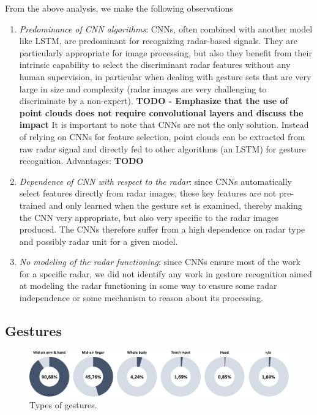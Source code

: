From the above analysis, we make the following observations
\begin{enumerate}
    \item \textit{Predominance of CNN algorithms}: CNNs, often combined with another model like LSTM, are predominant for recognizing radar-based signals. They are particularly appropriate for image processing, but also they benefit from their intrinsic capability to select the discriminant radar features without any human supervision, in particular when dealing with gesture sets that are very large in size and complexity (radar images are very challenging to discriminate by a non-expert).
    \textbf{TODO - Emphasize that the use of point clouds does not require convolutional layers and discuss the impact} 
    It is important to note that CNNs are not the only solution. Instead of relying on CNNs for feature selection, point clouds can be extracted from raw radar signal and directly fed to other algorithms (\eg an LSTM) for gesture recognition\cite{Palipana:2021}. Advantages: \textbf{TODO}
    \item \textit{Dependence of CNN with respect to the radar}: since CNNs automatically select features directly from radar images, these key features are not pre-trained and only learned when the gesture set is examined, thereby making the CNN very appropriate, but also very specific to the radar images produced. The CNNs therefore suffer from a high dependence on radar type and possibly radar unit for a given model. 
    \item \textit{No modeling of the radar functioning}: since CNNs ensure most of the work for a specific radar, we did not identify any work in gesture recognition aimed at modeling the radar functioning in some way to ensure some radar independence or some mechanism to reason about its processing. 
\end{enumerate}



\subsection{Gestures} \label{sec:state_of_the_art:radar:gestures}

\begin{figure}[hbt]
    \centering
    \includegraphics[width=\linewidth]{Figures/StateOfTheArt/Radar/gestures-type.pdf}
    \caption{Types of gestures.}
    \label{fig:state_of_the_art:radar:gestures-type}
\end{figure}


